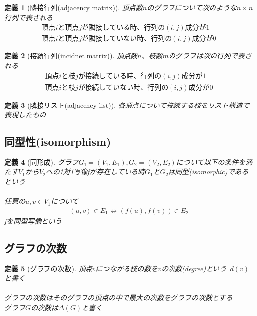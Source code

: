 \documentclass[a4j,10.5pt]{jarticle}
\theoremstyle{break}
\newtheorem{defi}{定義}[section]
\begin{document}
\begin{defi}[隣接行列(adjacency matrix)]
頂点数$n$のグラフについて次のような$n \times n$行列で表される
\begin{eqnarray*}
頂点iと頂点jが隣接している時、行列の(i,j)成分が1\\
頂点iと頂点jが隣接していない時、行列の(i,j)成分が0
\end{eqnarray*}
\end{defi}

\begin{defi}[接続行列(incidnet matrix)]
頂点数$n$、枝数$m$のグラフは次の行列で表される
\begin{eqnarray*}
頂点iと枝jが接続している時、行列の(i,j)成分が1\\
頂点iと枝jが接続していない時、行列の(i,j)成分が0
\end{eqnarray*}
\end{defi}

\begin{defi}[隣接リスト(adjacency list)]
各頂点について接続する枝をリスト構造で表現したもの
\end{defi}

\subsection*{同型性(isomorphism)}
\begin{defi}[同形成]
グラフ$G_1=(V_1,E_1),G_2=(V_2,E_2)$について以下の条件を満たす$V_1$から$V_2$への1対1写像fが存在している時$G_1$と$G_2$は同型(isomorphic)であるという\\
\\
任意の$u,v \in V_1$について
\begin{eqnarray*}
(u,v) \in E_1 \Leftrightarrow (f(u),f(v)) \in E_2
\end{eqnarray*}
fを同型写像という
\end{defi}

\subsection{グラフの次数}
\begin{defi}[グラフの次数]
頂点$v$につながる枝の数を$v$の次数(degree)という\ $d(v)$と書く\\
\\
グラフの次数はそのグラフの頂点の中で最大の次数をグラフの次数とする\\
グラフ$G$の次数は$\Delta(G)$と書く
\end{defi}
\end{document}
